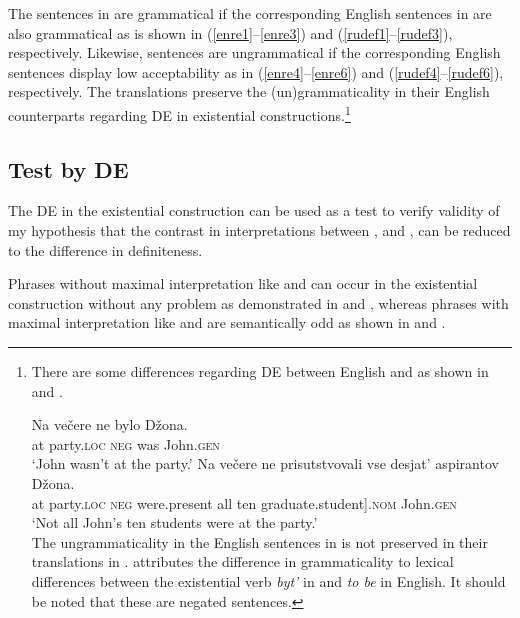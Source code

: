 \documentclass[output=paper]{langscibook}
\begin{document}
\noindent The  sentences in  are grammatical if the corresponding English sentences in  are also grammatical as is shown in (\ref{enre1}--\ref{enre3}) and (\ref{rudef1}--\ref{rudef3}), respectively. Likewise,  sentences are ungrammatical if the corresponding English sentences display low acceptability as in (\ref{enre4}--\ref{enre6}) and (\ref{rudef4}--\ref{rudef6}), respectively. The  translations preserve the (un)grammaticality in their English counterparts regarding DE in existential constructions.\footnote{There are some differences regarding DE between English and  as shown in  and .
    \ea\label{john-engl}
	\z\z

	\ea\label{Dzon}
	\ea
	\gll	Na večere ne bylo Džona.\\
	at party.\textsc{loc} \textsc{neg} was John.\textsc{gen}\\
	\glt `John wasn't at the party.'
	\ex
	\gll	Na večere ne prisutstvovali {} vse desjat' aspirantov Džona.\\
	at party.\textsc{loc} \textsc{neg} were.present \minsp{[} all ten graduate.student].\textsc{nom} John.\textsc{gen}\\
	\glt `Not all John's ten students were at the party.'
	\\ \hfill \citep[134-135]{Paducheva2000}
	\z\z
    \noindent The ungrammaticality in the English sentences in  is not preserved in their  translations in . \citet{Paducheva2000} attributes the difference in grammaticality to lexical differences between the existential verb \textit{byt'} in  and \textit{to be} in English. It should be noted that these are negated sentences.}

\subsection{Test by DE}\label{sec:testDE}

The  DE in the existential construction can be used as a test to verify validity of my hypothesis that the contrast in interpretations between ,  and ,  can be reduced to the difference in definiteness.

Phrases without maximal interpretation like  and  can occur in the existential construction without any problem as demonstrated in  and , whereas phrases with maximal interpretation like  and  are semantically odd as shown in  and .
\end{document}
